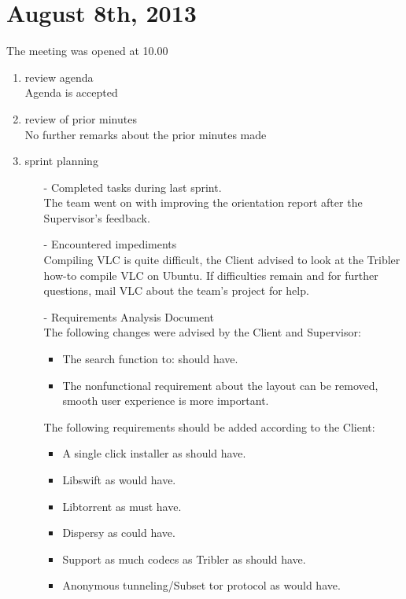 \section{August 8th, 2013}
\label{sec:req_meet}
The meeting was opened at 10.00

\begin{enumerate}
\item review agenda	\\
Agenda is accepted

\item review of prior minutes\\
No further remarks about the prior minutes made

\item sprint planning

\begin{enumerate}
\item[-] Completed tasks during last sprint.\\
The team went on with improving the orientation report after the Supervisor's feedback.

\item[-] Encountered impediments\\
Compiling VLC is quite difficult, the Client advised to look at the Tribler how-to compile VLC on Ubuntu. If difficulties remain and for further questions, mail VLC about the team's project for help.\\

\item[-] Requirements Analysis Document\\
The following changes were advised by the Client and Supervisor:

\begin{itemize}
	\item The search function to: should have.\\
	\item The nonfunctional requirement about the layout can be removed, smooth user experience is more important.\\
\end{itemize}

The following requirements should be added according to the Client:

\begin{itemize}
	\item A single click installer as should have.\\
	\item Libswift as would have.\\
	\item Libtorrent as must have.\\
	\item Dispersy as could have.\\
	\item Support as much codecs as Tribler as should have.\\
	\item Anonymous tunneling/Subset tor protocol as would have.\\
\end{itemize}


\end{enumerate}
\end{enumerate}
